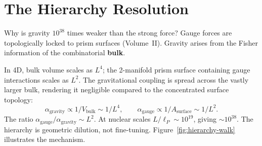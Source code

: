\documentclass[11pt, a4paper, openany]{book}
\begin{document}
\section{The Hierarchy Resolution}

Why is gravity $10^{38}$ times weaker than the strong force? Gauge forces
are topologically locked to prism surfaces (Volume~II). Gravity arises
from the Fisher information of the combinatorial \textbf{bulk}.

In 4D, bulk volume scales as $L^4$; the 2-manifold prism surface
containing gauge interactions scales as $L^2$. The gravitational
coupling is spread across the vastly larger bulk, rendering it
negligible compared to the concentrated surface topology:
\[
  \alpha_{\mathrm{gravity}} \propto 1/V_{\mathrm{bulk}} \sim 1/L^4,
  \qquad
  \alpha_{\mathrm{gauge}} \propto 1/A_{\mathrm{surface}} \sim 1/L^2.
\]
The ratio $\alpha_{\mathrm{gauge}}/\alpha_{\mathrm{gravity}} \sim L^2$.
At nuclear scales $L/\ell_P \sim 10^{19}$, giving $\sim 10^{38}$.
The hierarchy is geometric dilution, not fine-tuning.
Figure~\ref{fig:hierarchy-walk} illustrates the mechanism.
\end{document}
